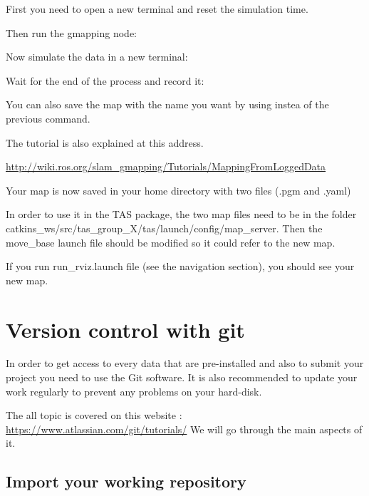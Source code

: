 First you need to open a new terminal and reset the simulation time.


Then run the gmapping node:


Now simulate the data in a new terminal:


Wait for the end of the process and record it:


You can also save the map with the name you want by using  instea of the previous command.


The tutorial is also explained at this address.

\hyperref[http://wiki.ros.org/slam_gmapping/Tutorials/MappingFromLoggedData]{http://wiki.ros.org/slam\_gmapping/Tutorials/MappingFromLoggedData}

Your map is now saved in your home directory with two files (.pgm and .yaml)

In order to use it in the TAS package, the two map files need to be in the folder catkins\_ws/src/tas\_group\_X/tas/launch/config/map\_server. Then the move\_base launch file should be modified so it could refer to the new map.

If you run run\_rviz.launch file (see the navigation section), you should see your new map.


\section{Version control with git}
\label{sec:advanced_git}

In order to get access to every data that are pre-installed and also to submit your project you need to use the Git software. It is also recommended to update your work regularly to prevent any problems on your hard-disk.

The all topic is covered on this website :
\hyperref[https://www.atlassian.com/git/tutorials/]{https://www.atlassian.com/git/tutorials/}
We will go through the main aspects of it.

\subsection{Import your working repository}

